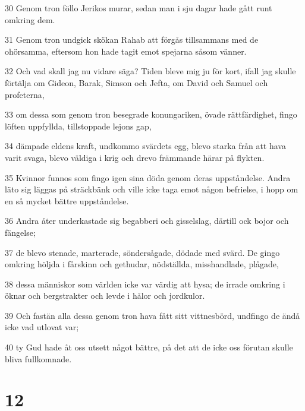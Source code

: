 \par 30 Genom tron föllo Jerikos murar, sedan man i sju dagar hade gått runt omkring dem.
\par 31 Genom tron undgick skökan Rahab att förgås tillsammans med de ohörsamma, eftersom hon hade tagit emot spejarna såsom vänner.
\par 32 Och vad skall jag nu vidare säga? Tiden bleve mig ju för kort, ifall jag skulle förtälja om Gideon, Barak, Simson och Jefta, om David och Samuel och profeterna,
\par 33 om dessa som genom tron besegrade konungariken, övade rättfärdighet, fingo löften uppfyllda, tillstoppade lejons gap,
\par 34 dämpade eldens kraft, undkommo svärdets egg, blevo starka från att hava varit svaga, blevo väldiga i krig och drevo främmande härar på flykten.
\par 35 Kvinnor funnos som fingo igen sina döda genom deras uppståndelse. Andra läto sig läggas på sträckbänk och ville icke taga emot någon befrielse, i hopp om en så mycket bättre uppståndelse.
\par 36 Andra åter underkastade sig begabberi och gisselslag, därtill ock bojor och fängelse;
\par 37 de blevo stenade, marterade, söndersågade, dödade med svärd. De gingo omkring höljda i fårskinn och gethudar, nödställda, misshandlade, plågade,
\par 38 dessa människor som världen icke var värdig att hysa; de irrade omkring i öknar och bergstrakter och levde i hålor och jordkulor.
\par 39 Och fastän alla dessa genom tron hava fått sitt vittnesbörd, undfingo de ändå icke vad utlovat var;
\par 40 ty Gud hade åt oss utsett något bättre, på det att de icke oss förutan skulle bliva fullkomnade.

\chapter{12}

